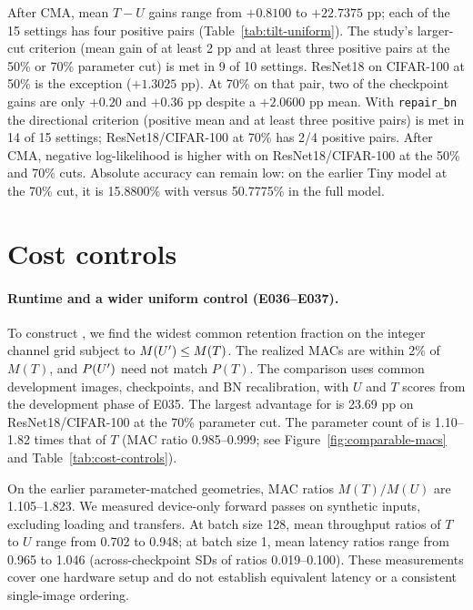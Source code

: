 After CMA, mean $T-U$ gains range from $+0.8100$ to $+22.7375$ pp;
each of the 15 settings has four positive pairs
(Table~\ref{tab:tilt-uniform}). The study's larger-cut criterion
(mean gain of at least 2 pp and at least three positive pairs at the
50\% or 70\% parameter cut) is met in 9 of 10 settings. ResNet18 on
CIFAR-100 at 50\% is the exception ($+1.3025$ pp). At 70\% on that pair,
two of the checkpoint gains are only $+0.20$ and $+0.36$
pp despite a $+2.0600$ pp mean. With \texttt{repair\_bn} the directional
criterion (positive mean and at least three positive pairs) is met in
14 of 15 settings; ResNet18/CIFAR-100 at 70\% has 2/4 positive
pairs. After CMA, negative log-likelihood is higher with
\Tilt{} on ResNet18/CIFAR-100 at the 50\% and 70\% cuts. Absolute
accuracy can remain low: on the earlier Tiny model at the 70\% cut, it is
15.8800\% with \Tilt{} versus 50.7775\% in the full model.


\FloatBarrier

\section{Cost controls}
\label{app:costs}

\paragraph{Runtime and a wider uniform control (E036--E037).}
To construct \Uprime{}, we find the widest common retention fraction on
the integer channel grid subject to $M(U'{})\le M(T)$. The
realized MACs are within 2\% of $M(T)$, and $P(U'{})$ need not match
$P(T)$. The comparison uses common development images, checkpoints, and
BN recalibration, with $U$ and $T$ scores from the development phase of
E035. The largest advantage for \Uprime{} is 23.69 pp on
ResNet18/CIFAR-100 at the 70\% parameter cut. The parameter count of \Uprime{} is
1.10--1.82 times that of $T$ (MAC ratio 0.985--0.999; see
Figure~\ref{fig:comparable-macs} and Table~\ref{tab:cost-controls}).

On the earlier parameter-matched geometries, MAC ratios $M(T)/M(U)$ are
1.105--1.823. We measured device-only forward passes on synthetic inputs,
excluding loading and transfers. At batch size 128, mean throughput
ratios of $T$ to $U$ range from 0.702 to 0.948; at batch size 1, mean
latency ratios range from 0.965 to 1.046 (across-checkpoint SDs of ratios
0.019--0.100). These measurements cover one hardware setup and do not
establish equivalent latency or a consistent single-image ordering.

